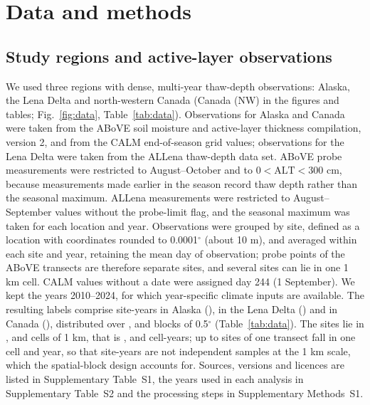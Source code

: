 \section{Data and methods}\label{sec:methods}

\subsection{Study regions and active-layer observations}
We used three regions with dense, multi-year thaw-depth observations: Alaska, the Lena Delta and north-western Canada (Canada (NW) in the figures and tables; Fig.~\ref{fig:data}, Table~\ref{tab:data}). Observations for Alaska and Canada were taken from the ABoVE soil moisture and active-layer thickness compilation, version 2\cite{Moore2025}, and from the CALM end-of-season grid values\cite{Streletskiy2025}; observations for the Lena Delta were taken from the ALLena thaw-depth data set\cite{Veremeeva2025}. ABoVE probe measurements were restricted to August--October and to $0<\mathrm{ALT}<300$ cm, because measurements made earlier in the season record thaw depth rather than the seasonal maximum. ALLena measurements were restricted to August--September values without the probe-limit flag, and the seasonal maximum was taken for each location and year. Observations were grouped by site, defined as a location with coordinates rounded to 0.0001$^\circ$ (about 10 m), and averaged within each site and year, retaining the mean day of observation; probe points of the ABoVE transects are therefore separate sites, and several sites can lie in one 1 km cell. CALM values without a date were assigned day 244 (1 September). We kept the years 2010--2024, for which year-specific climate inputs are available. The resulting labels comprise \nncyAk{} site-years in Alaska (\nyrsAk), \nncyLe{} in the Lena Delta (\nyrsLe) and \nncyCa{} in Canada (\nyrsCa), distributed over \nnblkAk, \nnblkLe{} and \nnblkCa{} blocks of 0.5$^\circ$ (Table~\ref{tab:data}). The sites lie in \nnkmcellAk, \nnkmcellLe{} and \nnkmcellCa{} cells of 1 km, that is \nnkmcyAk, \nnkmcyLe{} and \nnkmcyCa{} cell-years; up to \nnkmmaxAk{} sites of one transect fall in one cell and year, so that site-years are not independent samples at the 1 km scale, which the spatial-block design accounts for. Sources, versions and licences are listed in Supplementary Table~S1, the years used in each analysis in Supplementary Table~S2 and the processing steps in Supplementary Methods~S1.

